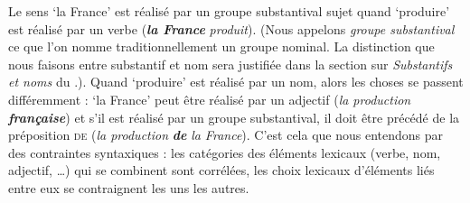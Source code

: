 Le sens ‘la France’ est réalisé par un groupe substantival sujet quand ‘produire’ est réalisé par un verbe (\textbf{\textit{la France}} \textit{produit}). (Nous appelons \textit{groupe substantival} ce que l’on nomme traditionnellement un groupe nominal. La distinction que nous faisons entre substantif et nom sera justifiée dans la section sur \textit{Substantifs et noms} du .). Quand ‘produire’ est réalisé par un nom, alors les choses se passent différemment : ‘la France’ peut être réalisé par un adjectif (\textit{la production} \textbf{\textit{française}}) et s’il est réalisé par un groupe substantival, il doit être précédé de la préposition \textsc{de} (\textit{la production} \textbf{\textit{de}} \textit{la France}). C’est cela que nous entendons par des contraintes syntaxiques : les catégories des éléments lexicaux (verbe, nom, adjectif, …) qui se combinent sont corrélées, les choix lexicaux d’éléments liés entre eux se contraignent les uns les autres.

